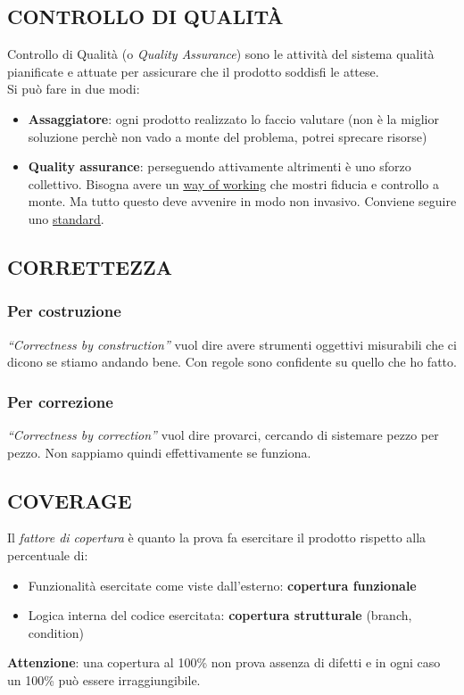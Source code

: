 		\subsection{CONTROLLO DI QUALITÀ}		\label{controlloqualita} %
		Controllo di Qualità (o \textit{Quality Assurance}) sono le attività del sistema qualità pianificate e attuate per assicurare che il prodotto soddisfi le attese. \\
		Si può fare in due modi:
		\begin{itemize}
			\item \textbf{Assaggiatore}: ogni prodotto realizzato lo faccio valutare (non è la miglior soluzione perchè non vado a monte del problema, potrei sprecare risorse)
			\item \textbf{Quality assurance}: perseguendo attivamente altrimenti è uno sforzo collettivo. Bisogna avere un \underline{\hyperref[way]{way of working}} che mostri fiducia e controllo a monte. Ma tutto questo deve avvenire in modo non invasivo. Conviene seguire uno \underline{\hyperref[standard]{standard}}.
		\end{itemize}


		\subsection{CORRETTEZZA}	 \label{correttezza}
			\subsubsection{Per costruzione}	\label{byconstruction}
			\textit{``Correctness by construction''} vuol dire avere strumenti oggettivi misurabili che ci dicono se stiamo andando bene. Con regole sono confidente su quello che ho fatto.
			\subsubsection{Per correzione} \label{bycorrection}
			\textit{``Correctness by correction''} vuol dire provarci, cercando di sistemare pezzo per pezzo. Non sappiamo quindi effettivamente se funziona.


		\subsection{COVERAGE}		\label{coverage}
		Il \textit{fattore di copertura} è quanto la prova fa esercitare il prodotto rispetto alla percentuale di:
		\begin{itemize}
			\item Funzionalità esercitate come viste dall'esterno: \textbf{copertura funzionale}
			\item Logica interna del codice esercitata: \textbf{copertura strutturale} (branch, condition)
		\end{itemize}
		\textbf{Attenzione}: una copertura al 100\% non prova assenza di difetti e in ogni caso un 100\% può essere irraggiungibile.


